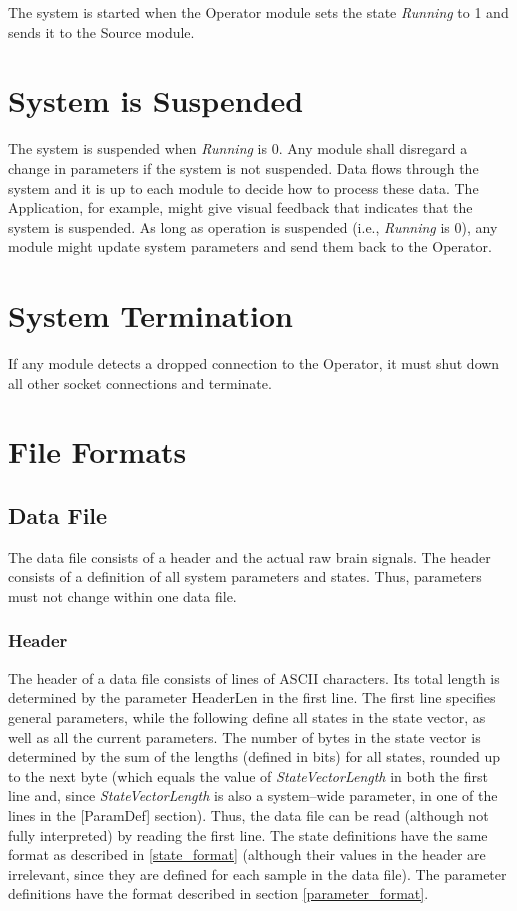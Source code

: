 \documentclass[letterpaper,oneside,12pt]{book}
\begin{document}
The system is started when the Operator module sets the state \textit{Running} 
to 1 and sends it to the Source module. 


\section{System is Suspended}
\label{sec:system_suspended}

The system is suspended when \textit{Running} is 0. Any module shall disregard a 
change in parameters if the system is not suspended. Data flows through the 
system and it is up to each module to decide how to process these data. The 
Application, for example, might give visual feedback that indicates that the 
system is suspended. As long as operation is suspended (i.e., \textit{Running} 
is 0), any module might update system parameters and send them back to the 
Operator.


\section{System Termination}
\label{system_termination}

If any module detects a dropped connection to the Operator, it must shut down 
all other socket connections and terminate.

\section{File Formats}

\subsection{Data File}

The data file consists of a header and the actual raw brain signals. The header 
consists of a definition of all system parameters and states. Thus, parameters 
must not change within one data file.

\subsubsection{Header}

The header of a data file consists of lines of ASCII characters. Its total 
length is determined by the parameter HeaderLen in the first line. The first 
line specifies general parameters, while the following define all states in the 
state vector, as well as all the current parameters. The number of bytes in the 
state vector is determined by the sum of the lengths (defined in bits) for all 
states, rounded up to the next byte (which equals the value of 
\textit{StateVectorLength} in both the first line and, since 
\textit{StateVectorLength} is also a system--wide parameter, in one of the lines 
in the [ParamDef] section). Thus, the data file can be read (although not fully 
interpreted) by reading the first line. The state definitions have the same 
format as described in \ref{state_format} (although their values in the header 
are irrelevant, since they are defined for each sample in the data file). The 
parameter definitions have the format described in section 
\ref{parameter_format}.
\end{document}
